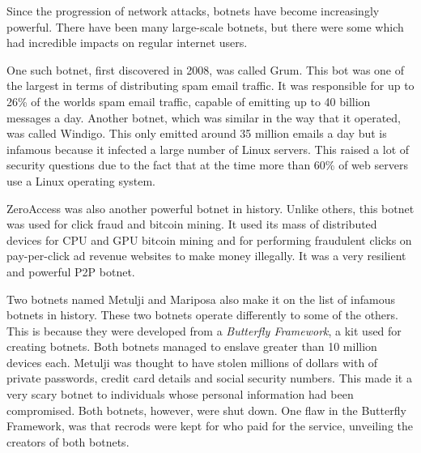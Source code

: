 \raggedright

Since the progression of network attacks, botnets have become
increasingly powerful. There have been many large-scale botnets,
but there were some which had incredible impacts on regular
internet users\textsuperscript{\cite{goodman2017survey}}.

\vspace{0.5cm}

One such botnet, first discovered in 2008, was called Grum. This
bot was one of the largest in terms of distributing spam email
traffic. It was responsible for up to 26\% of the worlds spam
email traffic, capable of emitting up to 40 billion messages
a day. Another botnet, which was similar in the way that it operated,
was called Windigo. This only emitted around 35 million emails a
day but is infamous because it infected a large number of Linux
servers. This raised a lot of security questions due to the fact
that at the time more than 60\% of web servers use a Linux
operating system.

\vspace{0.5cm}

ZeroAccess was also another powerful botnet in history. Unlike others,
this botnet was used for click fraud and bitcoin mining. It used its
mass of distributed devices for CPU and GPU bitcoin mining and for
performing fraudulent clicks on pay-per-click ad revenue websites
to make money illegally. It was a very resilient and powerful P2P
botnet.

\vspace{0.5cm}

Two botnets named Metulji and Mariposa\textsuperscript{\cite{sinha2010insights}} also make it on the list of
infamous botnets in history. These two botnets operate differently
to some of the others. This is because they were developed from a
\textit{Butterfly Framework}, a kit used for creating botnets. Both
botnets managed to enslave greater than 10 million devices each.
Metulji was thought to have stolen millions of dollars with of private
passwords, credit card details and social security numbers. This made
it a very scary botnet to individuals whose personal information had
been compromised.
Both botnets, however, were shut down. One flaw in the Butterfly Framework,
was that recrods were kept for who paid for the service, unveiling
the creators of both botnets.